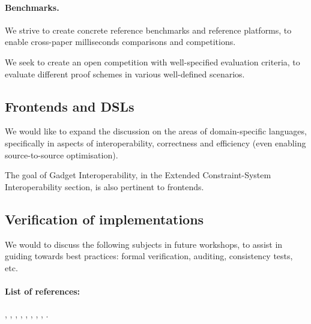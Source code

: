 \paragraph{Benchmarks.}
We strive to create concrete reference benchmarks and reference platforms, to enable cross-paper milliseconds comparisons and competitions.

We seek to create an open competition with well-specified evaluation criteria, to evaluate different proof schemes in various well-defined scenarios.



\subsection{Frontends and DSLs}
We would like to expand the discussion on the areas of domain-specific languages, specifically in aspects of interoperability, correctness and efficiency (even enabling source-to-source optimisation).

The goal of Gadget Interoperability, in the Extended Constraint-System Interoperability section, is also pertinent to frontends.



\subsection{Verification of implementations}
We would to discuss the following subjects in future workshops, to assist in guiding towards best practices: formal verification, auditing, consistency tests, etc.



\paragraph{List of references:}
\cite{2018:crypto:VDFs},
\cite{2014:SP:Zerocash},
\cite{2013:crypto:SNARKs-for-C},
\cite{2014:crypto:Scalable-Zero-Knowledge-via-Cycles-of-Elliptic-Curves},
\cite{2010:ICS:proof-carrying-data},
\cite{2016:SP:cinderella},
\cite{2016:Eurocrypt:On-the-Size-of-Pairing-Based-Non-interactive-Arguments},
\cite{2013:Eurocrypt:quadratic-span-programs-and-succinct-NIZKs-without-PCPs},
\cite{2013:SP:Pinocchio}.

